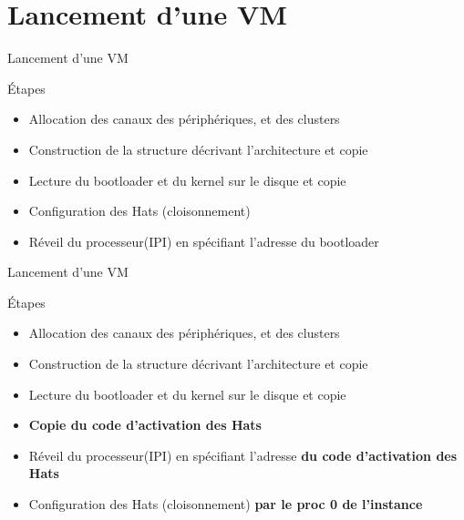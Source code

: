 \documentclass[12pt,francais]{beamer}
\begin{document}
\section*{Lancement d'une VM}
\footnotesize
\begin{frame}{Lancement d'une VM}
        \begin{block}{Étapes}
                \begin{center}
                        \begin{itemize}
                                \item Allocation des canaux des périphériques, et des clusters
                                \item Construction de la structure décrivant l'architecture et copie
                                \item Lecture du bootloader et du kernel sur le disque et copie
                                \item Configuration des Hats (cloisonnement)
                                \item Réveil du processeur(IPI) en spécifiant l'adresse du bootloader
                        \end{itemize}
                \end{center}
        \end{block}
\end{frame}
\begin{frame}{Lancement d'une VM}
        \begin{block}{Étapes}
                \begin{center}
                        \begin{itemize}
                                \item Allocation des canaux des périphériques, et des clusters
                                \item Construction de la structure décrivant l'architecture et copie
                                \item Lecture du bootloader et du kernel sur le disque et copie
                                \item \textbf{Copie du code d'activation des Hats}
                                \item Réveil du processeur(IPI) en spécifiant l'adresse\textbf{ du code d'activation des Hats}
                                \item Configuration des Hats (cloisonnement) \textbf{par le proc 0 de l'instance}
                        \end{itemize}
                \end{center}
        \end{block}
\end{frame}
\end{document}

